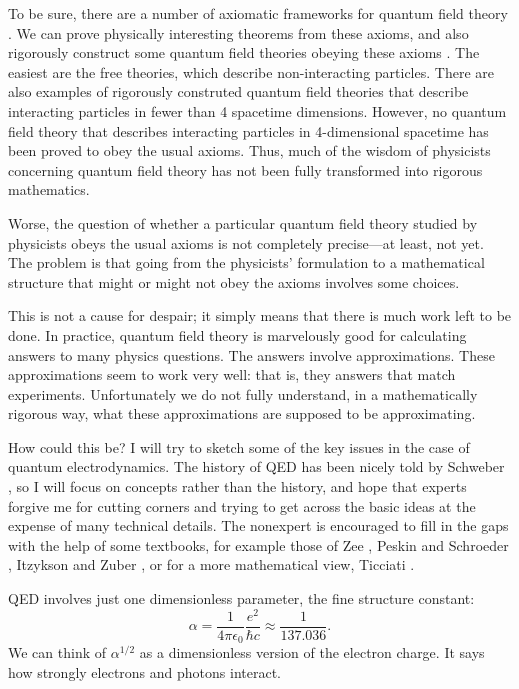 \documentclass{article}
\begin{document}
To be sure, there are a number of axiomatic frameworks for quantum field theory \cite{Haag,StreaterWightman}.  We can prove physically interesting theorems  from these axioms, and also rigorously construct some quantum field theories obeying these axioms \cite{BSZ,GlimmJaffe,Rivasseau}.  The easiest are the free theories,  which describe non-interacting particles.  There are also examples of rigorously  construted quantum field theories that describe interacting particles in fewer than 4 spacetime dimensions.  However, no quantum field theory that describes interacting particles in 4-dimensional spacetime has been proved to obey the usual axioms.   Thus, much of the wisdom of physicists concerning quantum field theory has not been fully transformed into rigorous mathematics.  

Worse, the question of whether a particular quantum field theory studied by physicists obeys the usual axioms is not completely precise---at least, not yet.  The problem is that going from the physicists' formulation to a mathematical structure that might or might not obey the axioms involves some choices.

This is not a cause for despair; it simply means that there is much work left to be done. In practice, quantum field theory is marvelously good for calculating answers to many physics questions.  The answers involve approximations.   These approximations seem to work very well: that is, they answers that match experiments.  Unfortunately we do not fully understand, in a mathematically rigorous way, what these approximations are supposed to be approximating.

How could this be?  I will try to sketch some of the key issues in the case of quantum electrodynamics.  The history of QED has been nicely told by Schweber \cite{Schweber}, so I will focus on concepts rather than the history, and hope that experts forgive me for cutting corners and trying to get across the basic ideas at the expense of many technical details.  The nonexpert is encouraged to fill in the gaps with the help of some textbooks, for example those of Zee \cite{Zee}, Peskin and Schroeder \cite{PS}, Itzykson and Zuber \cite{IZ}, or for a more mathematical view, Ticciati \cite{Ticciati}.

QED involves just one dimensionless parameter, the fine structure constant:
\[   \alpha = \frac{1}{4 \pi \epsilon_0} \frac{e^2}{\hbar c} \approx \frac{1}{137.036} .\]
We can think of $\alpha^{1/2}$ as a dimensionless version of the electron charge.  It  says how strongly electrons and photons interact.   
\end{document}
